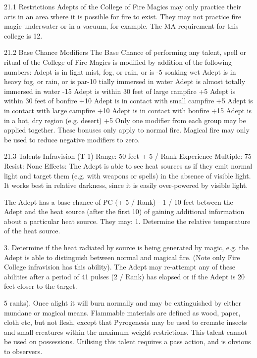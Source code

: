 \documentclass[a4paper]{article}
\begin{document}
\begin{multicols}{3}
21.1 Restrictions
Adepts of the College of Fire Magics may only
practice their arts in an area where it is possible for
fire to exist. They may not practice fire magic
underwater or in a vacuum, for example.
The MA requirement for this college is 12.

21.2 Base Chance Modifiers
The Base Chance of performing any talent, spell or
ritual of the College of Fire Magics is modified by
addition of the following numbers:
Adept is in light mist, fog, or rain, or is
-5
soaking wet
Adept is in heavy fog, or rain, or is par-10
tially immersed in water
Adept is almost totally immersed in water
-15
Adept is within 30 feet of large campfire
+5
Adept is within 30 feet of bonfire
+10
Adept is in contact with small campfire
+5
Adept is in contact with large campfire
+10
Adept is in contact with bonfire
+15
Adept is in a hot, dry region (e.g. desert)
+5
Only one modifier from each group may be applied
together. These bonuses only apply to normal fire.
Magical fire may only be used to reduce negative
modifiers to zero.

21.3 Talents
Infravision (T-1)
Range: 50 feet + 5 / Rank
Experience Multiple: 75
Resist: None
Effects: The Adept is able to see heat sources as if
they emit normal light and target them (e.g. with
weapons or spells) in the absence of visible light. It
works best in relative darkness, since it is easily
over-powered by visible light.

The Adept has a base chance of PC (+ 5 / Rank) - 1
/ 10 feet between the Adept and the heat source
(after the first 10) of gaining additional information
about a particular heat source. They may:
1. Determine the relative temperature of the heat
source.

3. Determine if the heat radiated by source is being
generated by magic, e.g. the Adept is able to distinguish between normal and magical fire. (Note
only Fire College infravision has this ability).
The Adept may re-attempt any of these abilities
after a period of 41 pulses (2 / Rank) has elapsed or
if the Adept is 20 feet closer to the target.

5 ranks). Once alight it will burn normally and may
be extinguished by either mundane or magical
means. Flammable materials are defined as wood,
paper, cloth etc, but not flesh, except that Pyrogenesis may be used to cremate insects and small
creatures within the maximum weight restrictions.
This talent cannot be used on possessions. Utilising
this talent requires a pass action, and is obvious to
observers.


\end{multicols}
\end{document}
